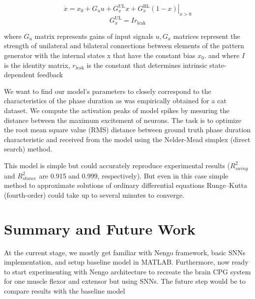 \documentclass[runningheads]{llncs}
\begin{document}
\begin{equation}
\dot{x}=x_{0}+G_{u} u+G_{x}^{\mathrm{UL}} x+\left.G_{x}^{\mathrm{BL}}(1-x)\right|_{x>0}
\end{equation}
\begin{equation}
G_{x}^{\mathrm{UL}}=I r_{\mathrm{leak}}
\end{equation}

where $G_u$ matrix represents gains of input signals
$u, G_x$ matrices represent the strength of unilateral
and bilateral connections between elements of the
pattern generator with the internal states x that
have the constant bias $x_{0}$. and where $I$ is the identity matrix, $r_{\mathrm{leak}}$ is the constant
that determines intrinsic state-dependent feedback

We want to find our model's parameters to closely correspond to the characteristics of the phase duration as was empirically obtained for a cat dataset. We compute the activation peaks of model spikes by mesuring the distance between the maximum excitement of neurons. The task is to optimize the root mean square value (RMS) distance between ground truth phase duration characteristic and received from the model using  the Nelder-Mead simplex (direct search) method. 

This model is simple but could accurately reproduce experimental results
($R_{swing}^2$ and $R_{stance}^2$  are 0.915 and 0.999, respectively). But even in this case simple method to approximate solutions of ordinary differential equations Runge–Kutta (fourth-order) could take up to several minutes to converge. 

\section{Summary and Future Work}
At the current stage, we mostly get familiar with Nengo framework, basic SNNs implementation, and setup baseline model in MATLAB. Furthermore, now ready to start experimenting with Nengo architecture to recreate the brain CPG system for one muscle flexor and extensor but using SNNs. The future step would be to compare results with the baseline model
\end{document}
